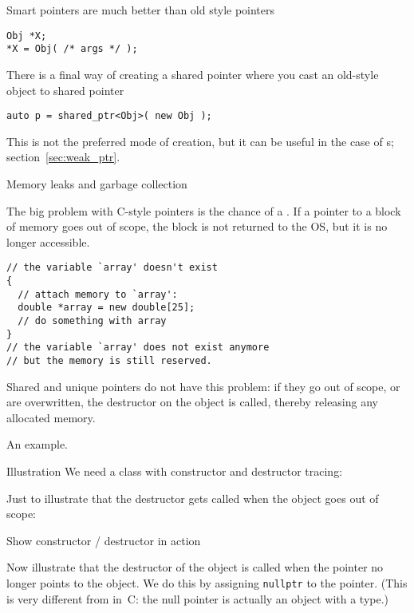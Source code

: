 Smart pointers are much better than old style pointers
\begin{lstlisting}
Obj *X;
*X = Obj( /* args */ );
\end{lstlisting}

There is a final way of creating a shared pointer where you cast an
old-style
 object to shared
pointer
\begin{lstlisting}
auto p = shared_ptr<Obj>( new Obj );
\end{lstlisting}
This is not the preferred mode of creation, but it can be useful in the case of
s; section~\ref{sec:weak_ptr}.

 {Memory leaks and garbage collection}
\label{sec:leak}

The big problem with C-style pointers is the chance of a
. If a pointer to a block of memory goes out of
scope, the block is not returned to the \ac{OS}, but it is no longer
accessible.
\begin{lstlisting}
// the variable `array' doesn't exist
{
  // attach memory to `array':
  double *array = new double[25];
  // do something with array
}
// the variable `array' does not exist anymore
// but the memory is still reserved.
\end{lstlisting}
Shared and unique
pointers do not have this problem: if they go out of scope, or are
overwritten, the destructor on the object is called, thereby releasing
any allocated memory.

An example.

\begin{block}{Illustration}
  \label{sl:construct-destruct-trace}
  We need a class with constructor and destructor tracing:
\end{block}

Just to illustrate that the destructor gets called when the object
goes out of scope:

\begin{block}{Show constructor / destructor in action}
  \label{sl:thing-con-dest}
\end{block}

Now illustrate that the destructor of the object is called
when the pointer no longer points to the object.
We do this by assigning \lstinline{nullptr} to the pointer.
(This is very different from  in~C:
the null pointer is actually an object with a type.)

